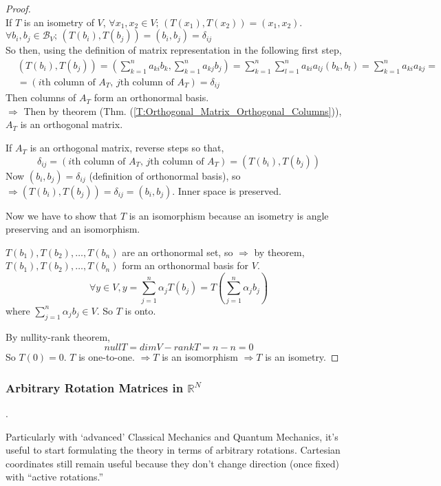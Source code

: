 \documentclass[twoside]{amsart}
\theoremstyle{plain}
\theoremstyle{definition}
\begin{document}
\begin{proof}  \quad \\
  If $T$ is an isometry of $V$, $\forall x_1, x_2 \in V; \, (T(x_1),T(x_2)) = (x_1,x_2) $.  \\
  $\forall b_i, b_j \in \mathcal{B}_V; \, (T(b_i), T(b_j)) = (b_i, b_j) = \delta_{ij}$  \\
  So then, using the definition of matrix representation in the following first step,  
  \[
  \begin{aligned}
    &  (T(b_i),T(b_j)) = (\sum_{k=1}^n a_{ki} b_k, \sum_{k=1}^n a_{kj} b_j ) = \sum_{k=1}^n \sum_{l=1}^n a_{ki} a_{lj} (b_k, b_l) = \sum_{k=1}^n a_{ki} a_{kj} = \\
    & = ( i\text{th column of $A_T$, $j$th column of $A_T$}) = \delta_{ij} 
  \end{aligned}
  \]
  Then columns of $A_T$ form an orthonormal basis.  \\
  $\Longrightarrow$ Then by theorem (Thm. (\ref{T:Orthogonal_Matrix_Orthogonal_Columns})), $A_T$ is an orthogonal matrix.

  If $A_T$ is an orthogonal matrix, reverse steps so that, 
\[
\delta_{ij} = (\text{$i$th column of $A_T$, $j$th column of $A_T$}) = (T(b_i),T(b_j))
\]
Now $(b_i,b_j) = \delta_{ij}$ (definition of orthonormal basis), so \bigskip \\
$\Longrightarrow  (T(b_i),T(b_j)) = \delta_{ij} = (b_i,b_j)$.  Inner space is preserved.  

Now we have to show that $T$ is an isomorphism because an isometry is angle preserving and an isomorphism.  

$T(b_1), T(b_2), \dots , T(b_n)$ are an orthonormal set, so $\Longrightarrow$ by theorem, $T(b_1),T(b_2), \dots , T(b_n)$ form an orthonormal basis for $V$.  
\[
\forall y \in V, y = \sum_{j=1}^n \alpha_j T(b_j) = T\left( \sum_{j=1}^n \alpha_j b_j \right)
\]
where $\sum_{j=1}^n \alpha_j b_j \in V$.  So $T$ is onto.  

By nullity-rank theorem, 
\[
null T = dim V - rank T = n - n = 0 
\]
So $T(0)=0$.  $T$ is one-to-one.  $\Longrightarrow T$ is an isomorphism $\Longrightarrow T$ is an isometry.  
\end{proof}

\subsubsection{ Arbitrary Rotation Matrices in $\mathbb{R}^N$ }.  

Particularly with `advanced' Classical Mechanics and Quantum Mechanics, it's useful to start formulating the theory in terms of arbitrary rotations.  Cartesian coordinates still remain useful because they don't change direction (once fixed) with ``active rotations.''  
\end{document}
